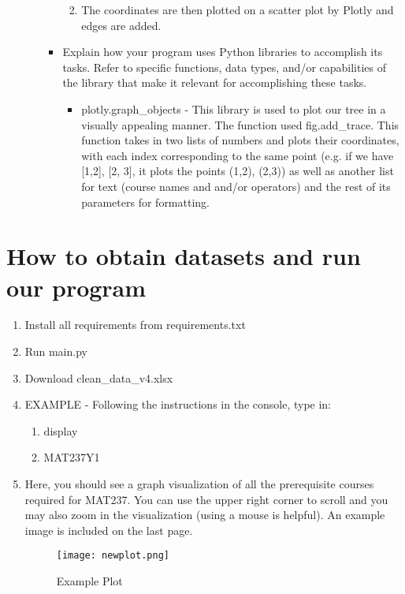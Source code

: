 \documentclass[fontsize=11pt]{article}
\begin{document}
\begin{enumerate}
\begin{itemize}
\begin{itemize}
\begin{enumerate}
\begin{itemize}
                \end{itemize}
                \item The coordinates are then plotted on a scatter plot by Plotly and edges are added.
            \end{enumerate}
        \item Explain how your program uses Python libraries to accomplish its tasks. Refer to specific functions, data types, and/or capabilities of the library that make it relevant for accomplishing these tasks. \begin{itemize}
            \item plotly.graph\_objects - This library is used to plot our tree in a visually appealing manner. The function used fig.add\_trace. This function takes in two lists of numbers and plots their coordinates, with each index corresponding to the same point (e.g. if we have [1,2], [2, 3], it plots the points (1,2), (2,3)) as well as another list for text (course names and and/or operators) and the rest of its parameters for formatting.
        \end{itemize}
        \end{itemize}
    \end{itemize}
\end{enumerate}
\section*{How to obtain datasets and run our program}

\begin{enumerate}
    \item Install all requirements from requirements.txt 
    \item Run main.py
    \item Download clean\_data\_v4.xlsx
    \item EXAMPLE - Following the instructions in the console, type in:
    \begin{enumerate}
        \item display
        \item MAT237Y1
    \end{enumerate}
    \item Here, you should see a graph visualization of all the prerequisite 
    courses required for MAT237. You can use the upper right corner to scroll and you may also zoom in the visualization (using a mouse is helpful). An example image is included on the last page.
\begin{figure}[h]
    \centering
    \texttt{[image: newplot.png]}
    \caption{Example Plot}
    \label{fig:enter-label}
\end{figure}
\end{enumerate}
\end{document}
